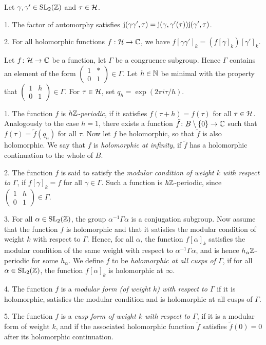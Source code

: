 \begin{remark}
 Let $\gamma,\gamma'\in\operatorname{SL}_2(\mathbb{Z})$ and $\tau\in\mathcal{H}$.
 
 1. The factor of automorphy satisfies $\mathrm{j}(\gamma\gamma',\tau) = \mathrm{j}(\gamma,\gamma'(\tau))\mathrm{j}(\gamma',\tau)$.
 
 2. For all holomorphic functions $f:\mathcal{H}\to\mathbb{C}$, we have $f[\gamma\gamma']_k=(f[\gamma]_k)[\gamma']_k$.
\end{remark}

\begin{defi} \label{df:modular-forms} Let $f\colon \mathcal{H} \to \mathbb{C}$ be a function, let $\Gamma$ be a congruence subgroup. Hence $\Gamma$ contains an element of the form $\left(\begin{smallmatrix}1 & *\\0 & 1\end{smallmatrix}\right)\in\Gamma$. Let $h\in\mathbb{N}$ be minimal with the property that $\left(\begin{smallmatrix}1 & h\\0 & 1\end{smallmatrix}\right)\in\Gamma$. For $\tau\in\mathcal{H}$, set $q_h=\exp(2\pi i\tau/h)$.

  1. The function $f$ is \emph{$h\mathbb{Z}$-periodic}, if it satisfies $f(\tau + h) = f(\tau)$ for all $\tau \in \mathcal{H}$. Analogously to the case $h=1$, there exists a function $\tilde f\colon B\setminus \{0\} \to \mathbb{C}$ such that $f(\tau)=\tilde f(q_h)$ for all $\tau$. Now let $f$ be holomorphic, so that $\tilde f$ is also holomorphic. We say that $f$ is \emph{holomorphic at infinity}, if $\tilde f$ has a holomorphic continuation to the whole of $B$.
  
  2. The function $f$ is said to satisfy the \emph{modular condition of weight $k$ with respect to $\Gamma$}, if $f[\gamma]_k=f$ for all $\gamma \in \Gamma$. Such a function is $h\mathbb{Z}$-periodic, since $\left(\begin{smallmatrix}1 & h\\0 & 1\end{smallmatrix}\right)\in\Gamma$.
  
  3. For all $\alpha\in\operatorname{SL}_2(\mathbb{Z})$, the group $\alpha^{-1}\Gamma\alpha$ is a conjugation subgroup. Now assume that the function $f$ is holomorphic and that it satisfies the modular condition of weight $k$ with respect to $\Gamma$. Hence, for all $\alpha$, the function $f[\alpha]_k$ satisfies the modular condition of the same weight with respect to $\alpha^{-1}\Gamma\alpha$, and is hence $h_\alpha\mathbb{Z}$-periodic for some $h_\alpha$. We define $f$ to be \emph{holomorphic at all cusps of $\Gamma$}, if for all $\alpha\in\operatorname{SL}_2(\mathbb{Z})$, the function $f[\alpha]_k$ is holomorphic at $\infty$.
  
  4. The function $f$ is a \emph{modular form (of weight $k$) with respect to $\Gamma$} if it is holomorphic, satisfies the modular condition and is holomorphic at all cusps of $\Gamma$.
  
  5. The function $f$ is a \emph{cusp form of weight $k$ with respect to $\Gamma$}, if it is a modular form of weight $k$, and if the associated holomorphic function $\tilde{f}$ satisfies $\tilde{f}(0)=0$ after its holomorphic continuation. 
\end{defi}

